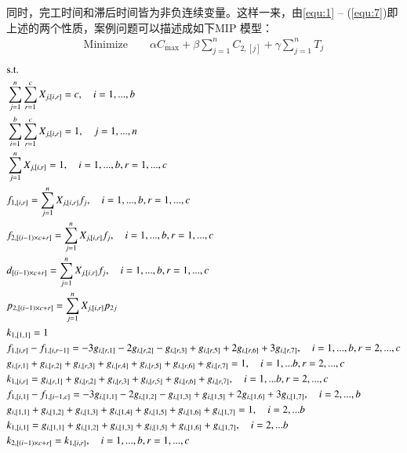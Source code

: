 同时，完工时间和滞后时间皆为非负连续变量。这样一来，由\eqref{equ:1} -- (\ref{equ:7})即上述的两个性质，案例问题可以描述成如下MIP 模型：
\begin{gather}
\text{Minimize}\qquad \alpha C_{\max}+\beta\sum_{j=1}^n C_{2,[j]}+\gamma\sum_{j=1}^n T_j \label{equ:8}
\end{gather}
\begin{align}
&\text{s.t.}\notag\\
& \sum_{j=1}^n\sum_{r=1}^c X_{j,[i,r]} = c,\quad i=1,...,b\label{equ:9}\\
& \sum_{i=1}^b\sum_{r=1}^c X_{j,[i,r]} = 1,\quad j=1,...,n\label{equ:10}\\
& \sum_{j=1}^n X_{j,[i,r]} = 1,\quad i=1,...,b, r=1,...,c\label{equ:11}\\
&f_{1,[i,r]} = \sum_{j=1}^n X_{j,[i,r]}f_j,\quad i=1,...,b, r=1,...,c\label{equ:12}\\
&f_{2,[(i-1)\times c + r]} = \sum_{j=1}^n X_{j,[i,r]}f_j,\quad i=1,...,b, r=1,...,c\label{equ:13}\\
&d_{[(i-1)\times c + r]} = \sum_{j=1}^n X_{j,[i,r]}f_j,\quad i=1,...,b, r=1,...,c\label{equ:14}\\
&p_{2,[(i-1)\times c + r]} = \sum_{j=1}^n X_{j,[i,r]}p_{2j}\label{equ:15}\\
&k_{1,[1,1]} = 1\label{equ:16}\\
&f_{1,[i,r]}-f_{1,[i,r-1]} = - 3g_{i,[r,1]} - 2g_{i,[r,2]} - g_{i,[r,3]} + g_{i,[r,5]} + 2g_{i,[r,6]} + 3g_{i,[r,7]},\quad i=1,...,b, r=2,...,c\label{equ:17}\\
&g_{i,[r,1]} + g_{i,[r,2]} + g_{i,[r,3]} + g_{i,[r,4]} + g_{i,[r,5]} + g_{i,[r,6]} + g_{i,[r,7]} = 1,\quad i=1,...b, r=2,...,c\label{equ:18}\\
&k_{1,[i,r]} = g_{i,[r,1]} + g_{i,[r,2]} + g_{i,[r,3]} + g_{i,[r,5]} + g_{i,[r,6]} + g_{i,[r,7]},\quad i=1,...b, r=2,...,c\label{equ:19}\\
&f_{1,[i,1]}-f_{1,[i-1,c]} = - 3g_{i,[1,1]} - 2g_{i,[1,2]} - g_{i,[1,3]} + g_{i,[1,5]} + 2g_{i,[1,6]} + 3g_{i,[1,7]},\quad i=2,...,b\label{equ:20}\\
&g_{i,[1,1]} + g_{i,[1,2]} + g_{i,[1,3]} + g_{i,[1,4]} + g_{i,[1,5]} + g_{i,[1,6]} + g_{i,[1,7]} = 1,\quad i=2,...b\label{equ:21}\\
&k_{1,[i,1]} = g_{i,[1,1]} + g_{i,[1,2]} + g_{i,[1,3]} + g_{i,[1,5]} + g_{i,[1,6]} + g_{i,[1,7]},\quad i=2,...b\label{equ:22}\\
&k_{2,[(i-1)\times c + r]} = k_{1,[i,r]},\quad i=1,...,b, r=1,...,c\label{equ:23}\\

\end{align}
